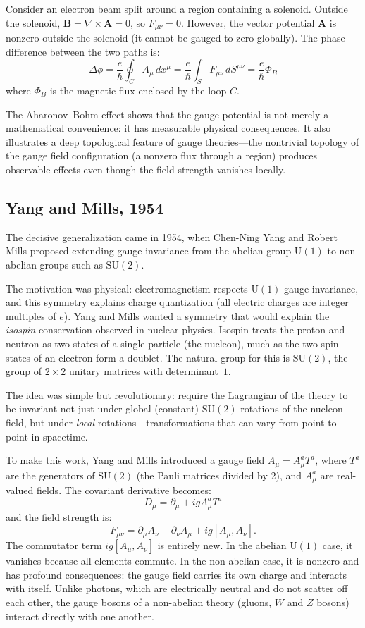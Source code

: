 Consider an electron beam split around a region containing a solenoid. Outside the solenoid, $\mathbf{B} = \nabla \times \mathbf{A} = 0$, so $F_{\mu\nu} = 0$. However, the vector potential $\mathbf{A}$ is nonzero outside the solenoid (it cannot be gauged to zero globally). The phase difference between the two paths is:
\[
\Delta\phi = \frac{e}{\hbar} \oint_C A_\mu \, dx^\mu = \frac{e}{\hbar} \int_S F_{\mu\nu} \, dS^{\mu\nu} = \frac{e}{\hbar} \Phi_B
\]
where $\Phi_B$ is the magnetic flux enclosed by the loop $C$.

The Aharonov--Bohm effect shows that the gauge potential is not merely a mathematical convenience: it has measurable physical consequences. It also illustrates a deep topological feature of gauge theories---the nontrivial topology of the gauge field configuration (a nonzero flux through a region) produces observable effects even though the field strength vanishes locally.

\subsection{Yang and Mills, 1954}

The decisive generalization came in 1954, when Chen-Ning Yang and Robert Mills proposed extending gauge invariance from the abelian group $\mathrm{U}(1)$ to non-abelian groups such as $\mathrm{SU}(2)$.

The motivation was physical: electromagnetism respects $\mathrm{U}(1)$ gauge invariance, and this symmetry explains charge quantization (all electric charges are integer multiples of $e$). Yang and Mills wanted a symmetry that would explain the \textit{isospin} conservation observed in nuclear physics. Isospin treats the proton and neutron as two states of a single particle (the nucleon), much as the two spin states of an electron form a doublet. The natural group for this is $\mathrm{SU}(2)$, the group of $2 \times 2$ unitary matrices with determinant~$1$.

The idea was simple but revolutionary: require the Lagrangian of the theory to be invariant not just under global (constant) $\mathrm{SU}(2)$ rotations of the nucleon field, but under \textit{local} rotations---transformations that can vary from point to point in spacetime.

To make this work, Yang and Mills introduced a gauge field $A_\mu = A_\mu^a T^a$, where $T^a$ are the generators of $\mathrm{SU}(2)$ (the Pauli matrices divided by 2), and $A_\mu^a$ are real-valued fields. The covariant derivative becomes:
\[
D_\mu = \partial_\mu + ig A_\mu^a T^a
\]
and the field strength is:
\[
F_{\mu\nu} = \partial_\mu A_\nu - \partial_\nu A_\mu + ig [A_\mu, A_\nu].
\]
The commutator term $ig[A_\mu, A_\nu]$ is entirely new. In the abelian $\mathrm{U}(1)$ case, it vanishes because all elements commute. In the non-abelian case, it is nonzero and has profound consequences: the gauge field carries its own charge and interacts with itself. Unlike photons, which are electrically neutral and do not scatter off each other, the gauge bosons of a non-abelian theory (gluons, $W$ and $Z$ bosons) interact directly with one another.

